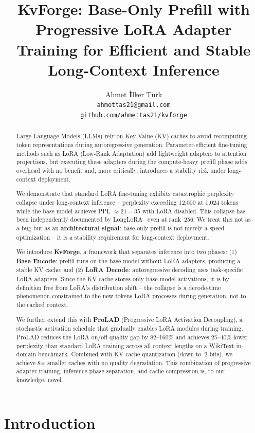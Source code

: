 \documentclass[11pt]{article}
\title{\textbf{KvForge: Base-Only Prefill with Progressive LoRA Adapter Training for Efficient and Stable Long-Context Inference}}
\author{Ahmet \textbf{\.{I}}lker T\"urk \\
\texttt{ahmettas21@gmail.com} \\
\href{https://github.com/ahmettas21/kvforge}{\texttt{github.com/ahmettas21/kvforge}}
}
\date{}
\begin{document}
\maketitle

\begin{abstract}
Large Language Models (LLMs) rely on Key-Value (KV) caches to avoid recomputing token representations during autoregressive generation. Parameter-efficient fine-tuning methods such as LoRA (Low-Rank Adaptation) add lightweight adapters to attention projections, but executing these adapters during the compute-heavy prefill phase adds overhead with no benefit and, more critically, introduces a stability risk under long-context deployment.

We demonstrate that standard LoRA fine-tuning exhibits catastrophic perplexity collapse under long-context inference -- perplexity exceeding 12,000 at 1,024 tokens while the base model achieves PPL $\approx 21{-}35$ with LoRA disabled. This collapse has been independently documented by LongLoRA~\cite{longlora} even at rank~256. We treat this not as a bug but as an \textbf{architectural signal}: base-only prefill is not merely a speed optimization -- it is a stability requirement for long-context deployment.

We introduce \textbf{KvForge}, a framework that separates inference into two phases: (1) \textbf{Base Encode}: prefill runs on the base model without LoRA adapters, producing a stable KV cache; and (2) \textbf{LoRA Decode}: autoregressive decoding uses task-specific LoRA adapters. Since the KV cache stores only base model activations, it is by definition free from LoRA's distribution shift -- the collapse is a decode-time phenomenon constrained to the new tokens LoRA processes during generation, not to the cached context.

We further extend this with \textbf{ProLAD} (Progressive LoRA Activation Decoupling), a stochastic activation schedule that gradually enables LoRA modules during training. ProLAD reduces the LoRA on/off quality gap by 82--160\% and achieves 25--40\% lower perplexity than standard LoRA training across all context lengths on a WikiText in-domain benchmark. Combined with KV cache quantization (down to~2 bits), we achieve 8$\times$ smaller caches with no quality degradation. This combination of progressive adapter training, inference-phase separation, and cache compression is, to our knowledge, novel.
\end{abstract}

\section{Introduction}
\label{sec:introduction}
\end{document}
